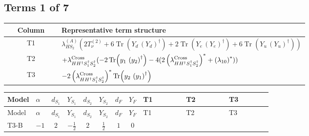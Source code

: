 \documentclass[8pt]{article}
\begin{document}
\begin{landscape}
\subsection*{Terms 1 of 7}
\begin{center}
\begin{tabular}{@{}c >{\raggedright\arraybackslash}p{0.82\linewidth}@{}}
\toprule
Column & Representative term structure \\
\midrule
T1 & \(\displaystyle {\lambda_{HS_2}^{(A)}} (2 T_{\nu}^{(2)}+6 \operatorname{Tr}\!\left({Y_d}\,\left({Y_d}\right)^{\dagger}\right)+2 \operatorname{Tr}\!\left({Y_e}\,\left({Y_e}\right)^{\dagger}\right)+6 \operatorname{Tr}\!\left({Y_u}\,\left({Y_u}\right)^{\dagger}\right))\) \\
\midrule
T2 & \(\displaystyle +{\lambda_{H H^\dagger S_1^\dagger S_2^\dagger}^{\rm Cross}} (-2 \operatorname{Tr}\!\left({y_1}\,\left({y_2}\right)^{\dagger}\right)-4 (2 \left({\lambda_{H H^\dagger S_1^\dagger S_2^\dagger}^{\rm Cross}}\right)^{*}+\left({\lambda_{10}}\right)^{*}))\) \\
\midrule
T3 & \(\displaystyle -2 \left({\lambda_{H H^\dagger S_1^\dagger S_2^\dagger}^{\rm Cross}}\right)^{*} \operatorname{Tr}\!\left({y_2}\,\left({y_1}\right)^{\dagger}\right)\) \\
\midrule
\bottomrule
\end{tabular}
\end{center}
\smallskip
\tiny
\begin{longtable}{@{}llcccccc >{\raggedright\arraybackslash}p{0.21\linewidth} >{\raggedright\arraybackslash}p{0.21\linewidth} >{\raggedright\arraybackslash}p{0.21\linewidth}@{}}
\toprule
Model & $\alpha$ & $d_{S_1}$ & $Y_{S_1}$ & $d_{S_2}$ & $Y_{S_2}$ & $d_F$ & $Y_F$ & T1 & T2 & T3 \\
\midrule
\endfirsthead
\toprule
Model & $\alpha$ & $d_{S_1}$ & $Y_{S_1}$ & $d_{S_2}$ & $Y_{S_2}$ & $d_F$ & $Y_F$ & T1 & T2 & T3 \\
\midrule
\endhead
T3-B & $-1$ & $2$ & $-\frac{1}{2}$ & $2$ & $\frac{1}{2}$ & $1$ & $0$ & \scriptsize\adjustbox{max width=\linewidth}{$\begin{gathered} {\lambda_{HS_2}^{(A)}} (2 T_{\nu}^{(2)}+6 \operatorname{Tr}\!\left({Y_d}\,\left({Y_d}\right)^{\dagger}\right)+2 \operatorname{Tr}\!\left({Y_e}\,\left({Y_e}\right)^{\dagger}\right)+6 \operatorname{Tr}\!\left({Y_u}\,\left({Y_u}\right)^{\dagger}\right))\end{gathered}$} & \scriptsize\adjustbox{max width=\linewidth}{$\begin{gathered} +{\lambda_{H H^\dagger S_1^\dagger S_2^\dagger}^{\rm Cross}} (-2 \operatorname{Tr}\!\left({y_1}\,\left({y_2}\right)^{\dagger}\right)-4 (2 \left({\lambda_{H H^\dagger S_1^\dagger S_2^\dagger}^{\rm Cross}}\right)^{*}+\left({\lambda_{10}}\right)^{*}))\end{gathered}$} & \scriptsize\adjustbox{max width=\linewidth}{$\begin{gathered} -2 \left({\lambda_{H H^\dagger S_1^\dagger S_2^\dagger}^{\rm Cross}}\right)^{*} \operatorname{Tr}\!\left({y_2}\,\left({y_1}\right)^{\dagger}\right)\end{gathered}$} \\

\end{longtable}
\end{landscape}
\end{document}
